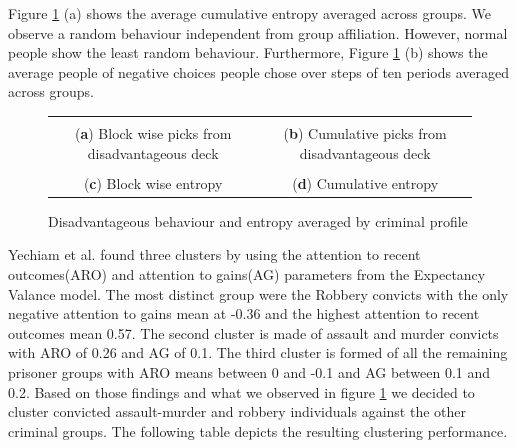\documentclass[12pt,a4paper,bibliography=totocnumbered,listof=totocnumbered]{scrartcl}
\begin{document}
Figure \ref{fig:ent} (a) shows the average cumulative entropy averaged across groups. We observe a random behaviour independent from group affiliation. However, normal people show the least random behaviour. Furthermore, Figure \ref{fig:ent} (b) shows the average people of negative choices people chose over steps of ten periods averaged across groups.     

{\renewcommand{\arraystretch}{0.4}%
\begin{figure}[H]
	\centering
	\small
	\hspace*{-0.7in}
	\begin{tabular}{cc}
	 &  \\
	(\textbf{a}) Block wise picks from disadvantageous deck & (\textbf{b}) Cumulative picks from disadvantageous deck  \\
	 &  \\
	(\textbf{c}) Block wise entropy  & (\textbf{d}) Cumulative entropy 
	\end{tabular} \quad
	\caption{Disadvantageous behaviour and entropy averaged by criminal profile }
	\label{fig:ent}
\end{figure}

Yechiam et al. found three clusters by using the attention to recent outcomes(ARO) and attention to gains(AG) parameters from the Expectancy Valance model. The most distinct group were the Robbery convicts with the only negative attention to gains mean at -0.36 and the highest attention to recent outcomes mean 0.57. The second cluster is made of assault and murder convicts with ARO of 0.26 and AG of 0.1. The third cluster is formed of all the remaining prisoner groups with ARO means between 0 and -0.1 and AG between 0.1 and 0.2.
Based on those findings and what we observed in figure \ref{fig:ent} we decided to cluster convicted assault-murder and robbery individuals against the other criminal groups. The following table depicts the resulting clustering performance.

}
\end{document}
